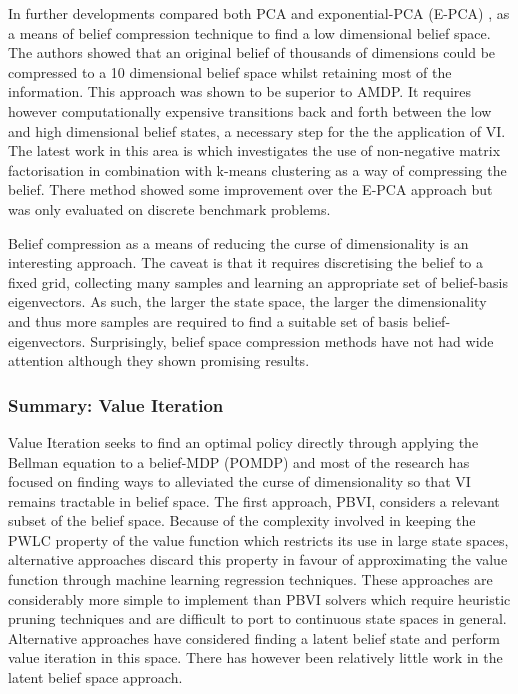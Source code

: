 In further developments \cite{belief_compression_2005} compared both PCA and exponential-PCA (E-PCA) \cite{EPCA_2003}, as a means of belief compression technique
to find a low dimensional belief space. The authors showed that an original belief of thousands of dimensions could be compressed 
to a 10 dimensional belief space whilst retaining most of the information. This approach was shown to be superior to AMDP. It requires however 
computationally expensive transitions back and forth between the low and high dimensional belief states, a necessary step for the the application of VI. The latest work in this 
area is \cite{bs_compression_2010} which investigates the use of non-negative matrix factorisation in combination with k-means 
clustering as a way of compressing the belief. There method showed some improvement over the E-PCA approach but was only evaluated 
on discrete benchmark problems.


Belief compression as a means of reducing the curse of dimensionality is an interesting approach. The 
caveat is that it requires discretising the belief to a fixed grid, collecting many samples and learning an 
appropriate set of belief-basis eigenvectors. As such, the larger the state space, the larger the dimensionality and thus more
samples are required to find a suitable set of basis belief-eigenvectors. Surprisingly, belief space compression 
methods have not had wide attention although they shown promising results.


\subsubsection{Summary: Value Iteration}

Value Iteration seeks to find an optimal policy directly through applying the Bellman equation to a belief-MDP (POMDP)
and most of the research has focused on finding ways to alleviated the curse of dimensionality so that VI remains tractable 
in belief space. The first approach, PBVI, considers a relevant subset of the belief space. Because 
of the complexity involved in keeping the PWLC property of the value function which restricts its use in large state 
spaces, alternative approaches discard this property in favour of approximating the value function through machine learning
regression techniques. These approaches are considerably more simple to implement than PBVI solvers which require heuristic pruning 
techniques and are difficult to port to continuous state spaces in general. Alternative approaches have considered finding a latent
belief state and perform value iteration in this space. There has however been relatively little work in the latent belief space approach.

